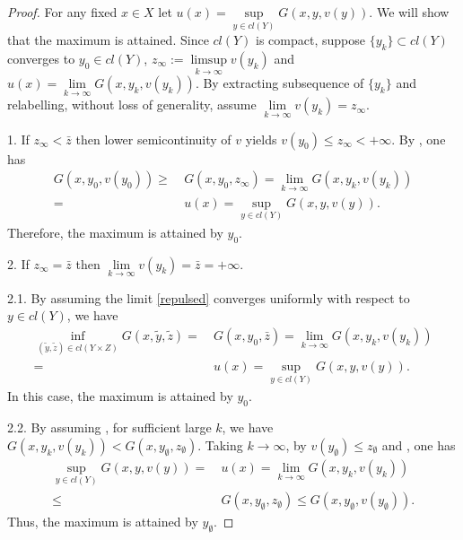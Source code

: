 								
\begin{proof}
	For any fixed $x \in X$ let $u(x) = \sup\limits_{y\in cl(Y)} G(x,y,v(y))$. We will show that the maximum is attained. Since $cl(Y)$ is compact, suppose $\{y_{k}\}\subset cl(Y)$ converges to $y_0 \in cl(Y)$,
	$z_\infty:= \limsup\limits_{k \to \infty} v(y_k)$ and $u(x) = \lim\limits_{k\to \infty} G(x, y_k,  v(y_k))$. By extracting subsequence of $\{y_k\}$ and relabelling, without loss of generality, assume $\lim\limits_{k\to \infty} v(y_k) = z_{\infty}$. \medskip
								
	1.  If $z_{\infty}< \bar{z}$ then lower semicontinuity of $v$ yields $v(y_0)\le z_{\infty} < +\infty$. By \Gfour, one has
		\begin{equation}
		\begin{split}
			G(x, y_0, v(y_0)) \ge & ~G(x, y_0, z_{\infty}) = \lim\limits_{k\to \infty} G(x, y_k,  v(y_k))\\
			= & ~u(x) = \sup\limits_{y\in cl(Y)} G(x,y,v(y)).
		\end{split}
		\end{equation}
	Therefore, the maximum is attained by $y_0$.\medskip
									
	2. If $z_{\infty} = \bar{z}$ then $\lim\limits_{k\to \infty} v(y_k) = \bar{z} = + \infty$.\medskip
									
		2.1. By assuming the limit \eqref{repulsed} converges uniformly with respect to  $y \in cl(Y)$, we have 
			\begin{equation*}
			\begin{split}
				\inf_{(\tilde{y}, \tilde{z})\in cl(Y\times Z)} G(x, \tilde{y}, \tilde{z}) = &~ G(x,y_0,\bar{z}) = \lim_{k \to \infty} G(x,y_k, v(y_k)) \\
				=&~ u(x) = \sup \limits_{y\in cl(Y)} G(x,y,v(y)).
			\end{split}
			\end{equation*}
		In this case, the maximum is attained by $y_0$. \medskip
									
		2.2. By assuming \Gfive, for sufficient large $k$, we have $G(x, y_k, v(y_k)) < G(x, y_{\emptyset}, z_{\emptyset})$. Taking $k \to \infty$, by $v(y_{\emptyset}) \le z_{\emptyset}$  and \Gfour, one has
			\begin{equation*}
			\begin{split}
				\sup\limits_{y\in cl(Y)} G(x,y,v(y)) = &~u(x) = \lim_{k \to \infty} G(x,y_k, v(y_k)) \\
				\le &~ G(x, y_{\emptyset}, z_{\emptyset}) \le G(x, y_{\emptyset}, v(y_{\emptyset})).
			\end{split}
			\end{equation*}
	Thus, the maximum is attained by $y_{\emptyset}$.
\end{proof}
									
